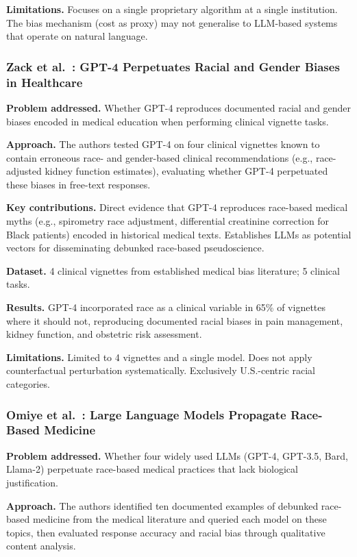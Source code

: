 \documentclass[12pt,a4paper]{article}
\begin{document}
\textbf{Limitations.}
Focuses on a single proprietary algorithm at a single institution. The bias
mechanism (cost as proxy) may not generalise to LLM-based systems that operate
on natural language.

\subsubsection*{Zack et al.\ \cite{zack2024}: GPT-4 Perpetuates Racial and
Gender Biases in Healthcare}

\textbf{Problem addressed.}
Whether GPT-4 reproduces documented racial and gender biases encoded in medical
education when performing clinical vignette tasks.

\textbf{Approach.}
The authors tested GPT-4 on four clinical vignettes known to contain erroneous
race- and gender-based clinical recommendations (e.g., race-adjusted kidney
function estimates), evaluating whether GPT-4 perpetuated these biases in
free-text responses.

\textbf{Key contributions.}
Direct evidence that GPT-4 reproduces race-based medical myths (e.g.,
spirometry race adjustment, differential creatinine correction for Black
patients) encoded in historical medical texts. Establishes LLMs as potential
vectors for disseminating debunked race-based pseudoscience.

\textbf{Dataset.}
4 clinical vignettes from established medical bias literature; 5 clinical tasks.

\textbf{Results.}
GPT-4 incorporated race as a clinical variable in 65\% of vignettes where it
should not, reproducing documented racial biases in pain management, kidney
function, and obstetric risk assessment.

\textbf{Limitations.}
Limited to 4 vignettes and a single model. Does not apply counterfactual
perturbation systematically. Exclusively U.S.-centric racial categories.

\subsubsection*{Omiye et al.\ \cite{omiye2023}: Large Language Models Propagate
Race-Based Medicine}

\textbf{Problem addressed.}
Whether four widely used LLMs (GPT-4, GPT-3.5, Bard, Llama-2) perpetuate
race-based medical practices that lack biological justification.

\textbf{Approach.}
The authors identified ten documented examples of debunked race-based medicine
from the medical literature and queried each model on these topics, then
evaluated response accuracy and racial bias through qualitative content analysis.
\end{document}
